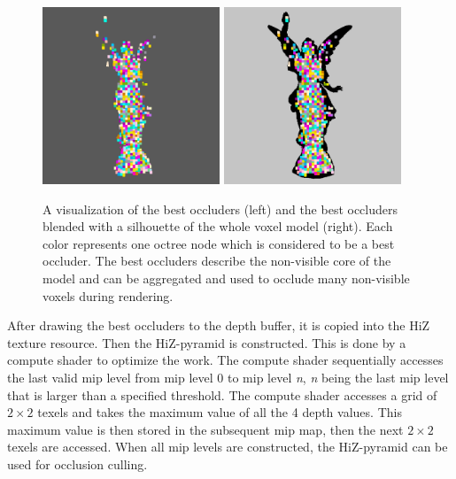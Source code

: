\begin{figure}[h]
    \centering
    \includegraphics[width=200px]{images/graphics/lucy-best-occluders-viz.jpg}
    \includegraphics[width=200px]{images/graphics/lucy-best-occluders-diff-viz.jpg}
    \caption{A visualization of the best occluders (left) and the best occluders blended with a silhouette 
    of the whole voxel model (right). Each color represents one octree node which is considered to be a best occluder.
    The best occluders describe the non-visible core of the model and can be aggregated and used to occlude 
    many non-visible voxels during rendering.}
    \label{fig:best-occluder-viz}
\end{figure}

\noindent 
After drawing the best occluders to the depth buffer, it is copied into the \ac{HiZ} texture resource. 
Then the \ac{HiZ}-pyramid is constructed. This is done by a compute shader to optimize the work. The compute shader 
sequentially accesses the last valid mip level from mip level 0 to mip level \emph{n}, \emph{n} being the last 
mip level that is larger than a specified threshold. The compute shader accesses a grid of \begin{math} 2 \times 2 
\end{math} texels and takes the maximum value of all the 4 depth values. This maximum value is then stored in the 
subsequent mip map, then the next \begin{math} 2 \times 2 \end{math} texels are accessed. When all mip levels are 
constructed, the \ac{HiZ}-pyramid can be used for occlusion culling. \\

